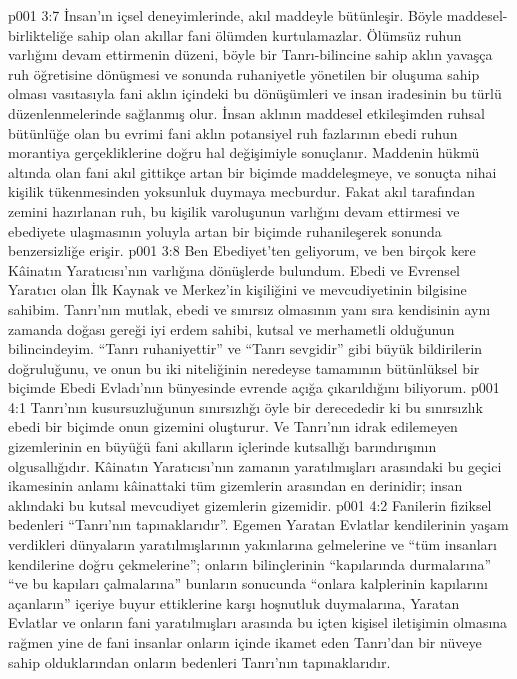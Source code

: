 \vs p001 3:7 İnsan’ın içsel deneyimlerinde, akıl maddeyle bütünleşir. Böyle maddesel\hyp{}birlikteliğe sahip olan akıllar fani ölümden kurtulamazlar. Ölümsüz ruhun varlığını devam ettirmenin düzeni, böyle bir Tanrı\hyp{}bilincine sahip aklın yavaşça ruh öğretisine dönüşmesi ve sonunda ruhaniyetle yönetilen bir oluşuma sahip olması vasıtasıyla fani aklın içindeki bu dönüşümleri ve insan iradesinin bu türlü düzenlenmelerinde sağlanmış olur. İnsan aklının maddesel etkileşimden ruhsal bütünlüğe olan bu evrimi fani aklın potansiyel ruh fazlarının ebedi ruhun morantiya gerçekliklerine doğru hal değişimiyle sonuçlanır. Maddenin hükmü altında olan fani akıl gittikçe artan bir biçimde maddeleşmeye, ve sonuçta nihai kişilik tükenmesinden yoksunluk duymaya mecburdur. Fakat akıl tarafından zemini hazırlanan ruh, bu kişilik varoluşunun varlığını devam ettirmesi ve ebediyete ulaşmasının yoluyla artan bir biçimde ruhanileşerek sonunda benzersizliğe erişir.
\vs p001 3:8 Ben Ebediyet’ten geliyorum, ve ben birçok kere Kâinatın Yaratıcısı’nın varlığına dönüşlerde bulundum. Ebedi ve Evrensel Yaratıcı olan İlk Kaynak ve Merkez’in kişiliğini ve mevcudiyetinin bilgisine sahibim. Tanrı’nın mutlak, ebedi ve sınırsız olmasının yanı sıra kendisinin aynı zamanda doğası gereği iyi erdem sahibi, kutsal ve merhametli olduğunun bilincindeyim. “Tanrı ruhaniyettir” ve “Tanrı sevgidir” gibi büyük bildirilerin doğruluğunu, ve onun bu iki niteliğinin neredeyse tamamının bütünlüksel bir biçimde Ebedi Evladı’nın bünyesinde evrende açığa çıkarıldığını biliyorum.
\vs p001 4:1 Tanrı’nın kusursuzluğunun sınırsızlığı öyle bir derecededir ki bu sınırsızlık ebedi bir biçimde onun gizemini oluşturur. Ve Tanrı’nın idrak edilemeyen gizemlerinin en büyüğü fani akılların içlerinde kutsallığı barındırışının olgusallığıdır. Kâinatın Yaratıcısı’nın zamanın yaratılmışları arasındaki bu geçici ikamesinin anlamı kâinattaki tüm gizemlerin arasından en derinidir; insan aklındaki bu kutsal mevcudiyet gizemlerin gizemidir.
\vs p001 4:2 Fanilerin fiziksel bedenleri “Tanrı’nın tapınaklarıdır”. Egemen Yaratan Evlatlar kendilerinin yaşam verdikleri dünyaların yaratılmışlarının yakınlarına gelmelerine ve “tüm insanları kendilerine doğru çekmelerine”; onların bilinçlerinin “kapılarında durmalarına” “ve bu kapıları çalmalarına” bunların sonucunda “onlara kalplerinin kapılarını açanların” içeriye buyur ettiklerine karşı hoşnutluk duymalarına, Yaratan Evlatlar ve onların fani yaratılmışları arasında bu içten kişisel iletişimin olmasına rağmen yine de fani insanlar onların içinde ikamet eden Tanrı’dan bir nüveye sahip olduklarından onların bedenleri Tanrı’nın tapınaklarıdır.
